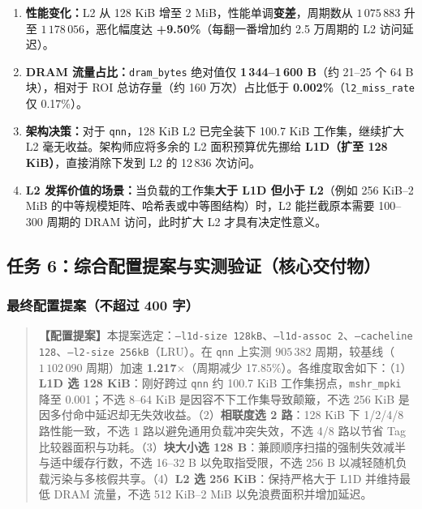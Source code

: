 \documentclass[12pt,a4paper,fontset=mac]{ctexart}
\begin{document}
\begin{enumerate}
  \item \textbf{性能变化：}L2 从 128 KiB 增至 2 MiB，性能单调\textbf{变差}，周期数从 $1\,075\,883$ 升至 $1\,178\,056$，恶化幅度达 \textbf{+9.50\%}（每翻一番增加约 2.5 万周期的 L2 访问延迟）。
  \item \textbf{DRAM 流量占比：}\texttt{dram\_bytes} 绝对值仅 \textbf{1\,344--1\,600 B}（约 21--25 个 64 B 块），相对于 ROI 总访存量（约 160 万次）占比低于 \textbf{0.002\%}（\texttt{l2\_miss\_rate} 仅 0.17\%）。
  \item \textbf{架构决策：}对于 \texttt{qnn}，128 KiB L2 已完全装下 100.7 KiB 工作集，继续扩大 L2 毫无收益。架构师应将多余的 L2 面积预算优先挪给 \textbf{L1D（扩至 128 KiB）}，直接消除下发到 L2 的 12\,836 次访问。
  \item \textbf{L2 发挥价值的场景：}当负载的工作集\textbf{大于 L1D 但小于 L2}（例如 256 KiB--2 MiB 的中等规模矩阵、哈希表或中等图结构）时，L2 能拦截原本需要 100--300 周期的 DRAM 访问，此时扩大 L2 才具有决定性意义。
\end{enumerate}

\subsection{任务 6：综合配置提案与实测验证（核心交付物）}

\subsubsection{最终配置提案（不超过 400 字）}
\begin{quote}
\textbf{【配置提案】}本提案选定：\texttt{--l1d-size 128kB}、\texttt{--l1d-assoc 2}、\texttt{--cacheline 128}、\texttt{--l2-size 256kB}（LRU）。在 \texttt{qnn} 上实测 $905\,382$ 周期，较基线（$1\,102\,090$ 周期）加速 \textbf{1.217$\times$}（周期减少 17.85\%）。各维度取舍如下：（1）\textbf{L1D 选 128 KiB}：刚好跨过 \texttt{qnn} 约 100.7 KiB 工作集拐点，\texttt{mshr\_mpki} 降至 0.001；不选 8--64 KiB 是因容不下工作集导致颠簸，不选 256 KiB 是因多付命中延迟却无失效收益。（2）\textbf{相联度选 2 路}：128 KiB 下 1/2/4/8 路性能一致，不选 1 路以避免通用负载冲突失效，不选 4/8 路以节省 Tag 比较器面积与功耗。（3）\textbf{块大小选 128 B}：兼顾顺序扫描的强制失效减半与适中缓存行数，不选 16--32 B 以免取指受限，不选 256 B 以减轻随机负载污染与多核假共享。（4）\textbf{L2 选 256 KiB}：保持严格大于 L1D 并维持最低 DRAM 流量，不选 512 KiB--2 MiB 以免浪费面积并增加延迟。
\end{quote}
\end{document}
